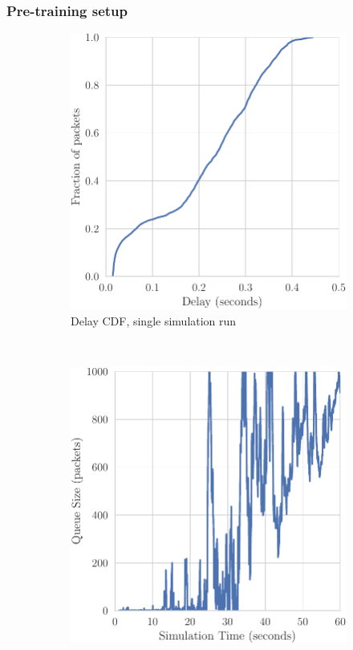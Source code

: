\documentclass{beamer}
\begin{document}
\begin{frame}
\frametitle{Pre-training setup}


\begin{figure}[h]
     
    \captionsetup[subfigure]{justification=centering}
    \begin{subfigure}[h]{0.5\textwidth}
    	\begin{center}
        \centering
        \includegraphics[scale=0.5]{figures/delay.pdf}
        \caption{Delay CDF, single simulation run}
        \end{center}
    \end{subfigure}%
    ~ 
    \begin{subfigure}[h]{0.5\textwidth}
    	\begin{center}
        \centering
        \includegraphics[scale=0.5]{figures/queue_profile_A.pdf}

\end{center}
\end{subfigure}
\end{figure}
\end{frame}
\end{document}

